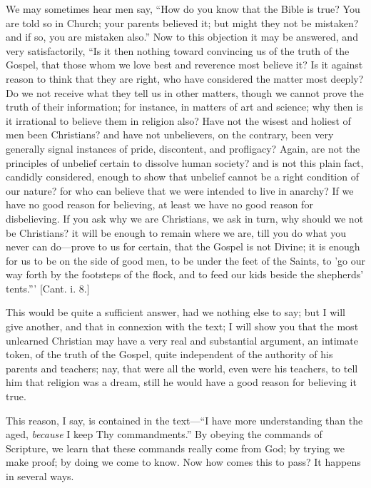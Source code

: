 We may sometimes hear men say, ``How do you know that the Bible
is true? You are told so in Church; your parents believed it; but
might they not be mistaken? and if so, you are mistaken also.''
Now to this objection it may be answered, and very satisfactorily,
``Is it then nothing toward convincing us of the truth of the
Gospel, that those whom we love best and reverence most believe it? Is
it against reason to think that they are right, who have considered
the matter most deeply? Do we not receive what they tell us in other
matters, though we cannot prove the truth of their information; for
instance, in matters of art and science; why then is it irrational to
believe them in religion also? Have not the wisest and holiest of men
been Christians? and have not unbelievers, on the contrary, been very
generally signal instances of pride, discontent, and profligacy?
Again, are not the principles of unbelief certain to dissolve human
society? and is not this plain fact, candidly considered, enough to
show that unbelief cannot be a right condition of our nature? for who
can believe that we were intended to live in anarchy? If we have no
good reason for believing, at least we have no good reason for
disbelieving. If you ask why we are Christians, we ask in turn, why
should we not be Christians? it will be enough to remain where we are,
till you do what you never can do—prove to us for certain, that the
Gospel is not Divine; it is enough for us to be on the side of good
men, to be under the feet of the Saints, to 'go our way forth by the
footsteps of the flock, and to feed our kids beside the shepherds'
tents.''' [Cant. i. 8.]

This would be quite a sufficient answer, had we nothing else to
say; but I will give another, and that in connexion with the text; I
will show you that the most unlearned Christian may have a very real
and substantial argument, an intimate token, of the truth of the
Gospel, quite independent of the authority of his parents and
teachers; nay, that were all the world, even were his teachers, to
tell him that religion was a dream, still he would have a good reason
for believing it true.

This reason, I say, is contained in the text—``I have more
understanding than the aged, \emph{because} I keep Thy
commandments.'' By obeying the commands of Scripture, we learn
that these commands really come from God; by trying we make proof; by
doing we come to know. Now how comes this to pass? It happens in
several ways.

